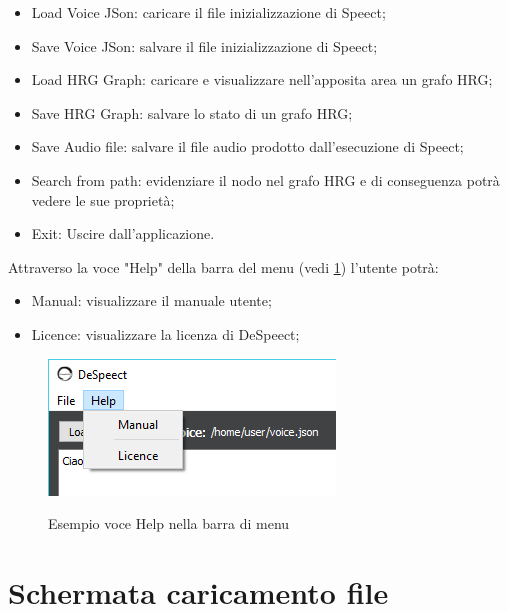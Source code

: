\documentclass[../AnalisideiRequisiti.tex]{subfiles}
\begin{document}
		\begin{itemize}
			\item{Load Voice JSon:} caricare il file inizializzazione di Speect;
			\item{Save Voice JSon:} salvare il file inizializzazione di Speect;
			\item{Load HRG Graph:} caricare e visualizzare nell'apposita area un grafo HRG;
			\item{Save HRG Graph:} salvare lo stato di un grafo HRG;
			\item{Save Audio file:} salvare il file audio prodotto dall'esecuzione di Speect;
			\item{Search from path:} evidenziare il nodo nel grafo HRG e di conseguenza potrà vedere le sue proprietà;
			\item{Exit:} Uscire dall'applicazione.
		\end{itemize}
		 Attraverso la voce "Help" della barra del menu (vedi \ref{fig:menuhelp}) l'utente potrà:
		\begin{itemize}
			\item{Manual:} visualizzare il manuale utente;
			\item{Licence:} visualizzare la licenza di DeSpeect;
			
		\end{itemize}
	
		\begin{figure}[htp]
			\caption{Esempio voce Help nella barra di menu}
			\centering
			\includegraphics[]{../img/menu-help.png}
			\label{fig:menuhelp}
		\end{figure}
		
	\section{Schermata caricamento file}
	
\end{document}
